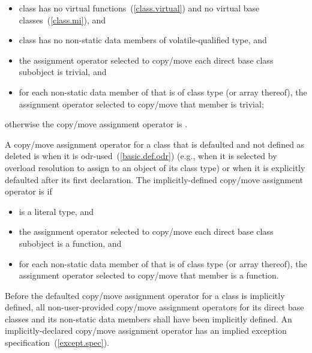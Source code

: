 \begin{itemize}
\item
class
has no virtual functions~(\ref{class.virtual})
and no virtual base classes~(\ref{class.mi}), and

\item class  has no non-static data members of volatile-qualified
type, and

\item the assignment operator selected to copy/move each direct
base class subobject is trivial, and

\item
for each non-static data member of
that is of class type (or array thereof),
the assignment operator selected to copy/move that member is trivial;
\end{itemize}

otherwise the copy/move assignment operator is
.

\pnum
{}%
%
A copy/move assignment operator for a class 
that is defaulted and not defined as deleted
is
when
it is odr-used~(\ref{basic.def.odr}) (e.g., when it is selected by overload resolution
to assign to an object of its class type)
or when it is explicitly defaulted after its first declaration.
The implicitly-defined copy/move assignment operator is  if
\begin{itemize}
\item
{} is a literal type, and

\item
the assignment operator selected to copy/move each direct base class subobject
is a  function, and

\item
for each non-static data member of  that is of class type (or array
thereof), the assignment operator selected to copy/move that member is a
 function.
\end{itemize}

\pnum
Before the defaulted copy/move assignment operator for a class is
implicitly defined,
all non-user-provided copy/move assignment operators for
its direct base classes and
its non-static data members shall have been implicitly defined.
\enternote
An implicitly-declared copy/move assignment operator has an
implied exception specification~(\ref{except.spec}).
\exitnote

